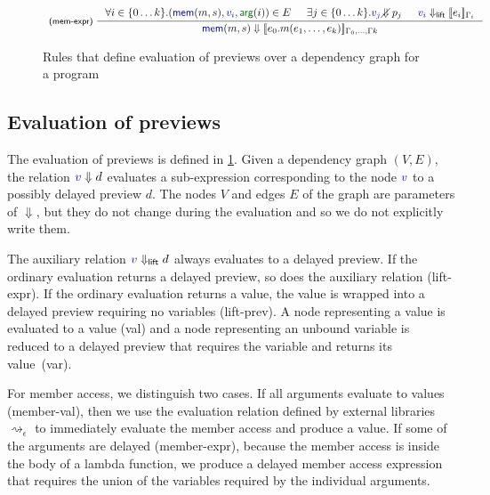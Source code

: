 \documentclass[english,crc,references=cleveref]{programming}
\theoremstyle{plain}
\theoremstyle{definition}
\newcommand{\ident}[1]{\textnormal{\textcolor{idclr}{\sffamily #1}}}
\newcommand{\bndclr}[1]{\textcolor{kvdclr}{#1}}
\newcommand{\bnd}[1]{\textnormal{\textcolor{kvdclr}{\sffamily #1}}}
\newcommand{\blbl}[1]{\textnormal{\textcolor{numclr}{\sffamily #1}}}
\newcommand{\rname}[1]{{\sffamily(#1)}}
\begin{document}
\begin{figure}
\begin{equation*}
\begin{array}{l}
\\
\inference[\rname{mem-expr}~]
  { \forall i\in\{0\ldots k\}.(\bnd{mem}(m, s), \bndclr{v_i}, \blbl{arg}(i)) \in E & \exists j\in\{0\ldots k\}.\bndclr{v_j}\diagup\hspace{-1em}\Downarrow p_j
   & \bndclr{v_i} \Downarrow_{\ident{lift}} \llbracket e_i \rrbracket_{\Gamma_i}  }
  { \bnd{mem}(m, s) \Downarrow \llbracket e_0.m(e_1, \ldots, e_k) \rrbracket_{\Gamma_0,\ldots,\Gamma k} }
\\
\end{array}
\end{equation*}
\caption{Rules that define evaluation of previews over a dependency graph for a program}
\label{fig:eval}
\end{figure}


\subsection{Evaluation of previews}
The evaluation of previews is defined in \cref{fig:eval}. Given a dependency graph $(V, E)$,
the relation $\bndclr{v}\Downarrow d$ evaluates a sub-expression corresponding to
the node $\bndclr{v}$ to a possibly delayed preview $d$. The nodes $V$ and edges $E$ of the
graph are parameters of $\Downarrow$, but they do not change during the
evaluation and so we do not explicitly write them.

The auxiliary relation $\bndclr{v}\Downarrow_{\ident{lift}} d$ always evaluates
to a delayed preview. If the ordinary evaluation returns a delayed preview, so does the auxiliary
relation \rname{lift-expr}. If the ordinary evaluation returns a value, the value is wrapped
into a delayed preview requiring no variables \rname{lift-prev}.
%
A node representing a value is evaluated to a value \rname{val} and a node representing
an unbound variable is reduced to a delayed preview that requires the variable and returns its
value~\rname{var}.

For member access, we distinguish two cases. If all arguments evaluate to values \rname{member-val},
then we use the evaluation relation defined by external libraries $\rightsquigarrow_\epsilon$ to
immediately evaluate the member access and produce a value. If some of the arguments are
delayed \rname{member-expr}, because the member access is inside the body of a lambda function,
we produce a delayed member access expression that requires the union of the variables
required by the individual arguments.
\end{document}
